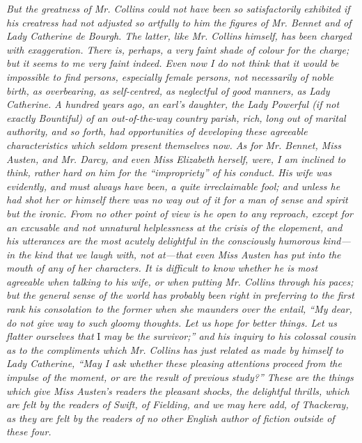 \documentclass[12pt]{book}
\begin{document}
\textit{But the greatness of Mr. Collins could not have been so satisfactorily exhibited if his creatress had not adjusted so artfully to him the figures of Mr. Bennet and of Lady Catherine de Bourgh. The latter, like Mr. Collins himself, has been charged with exaggeration. There is, perhaps, a very faint shade of colour for the charge; but it seems to me very faint indeed. Even now I do not think that it would be impossible to find persons, especially female persons, not necessarily of noble birth, as overbearing, as self-centred, as neglectful of good manners, as Lady Catherine. A hundred years ago, an earl's daughter, the Lady Powerful (if not exactly Bountiful) of an out-of-the-way country parish, rich, long out of marital authority, and so forth, had opportunities of developing these agreeable characteristics which seldom present themselves now. As for Mr. Bennet, Miss Austen, and Mr. Darcy, and even Miss Elizabeth herself, were, I am inclined to think, rather hard on him for the ``impropriety'' of his conduct. His wife was evidently, and must always have been, a quite irreclaimable fool; and unless he had shot her or himself there was no way out of it for a man of sense and spirit but the ironic. From no other point of view is he open to any reproach, except for an excusable and not unnatural helplessness at the crisis of the elopement, and his utterances are the most acutely delightful in the consciously humorous kind---in the kind that we laugh with, not at---that even Miss Austen has put into the mouth of any of her characters. It is difficult to know whether he is most agreeable when talking to his wife, or when putting Mr. Collins through his paces; but the general sense of the world has probably been right in preferring to the first rank his consolation to the former when she maunders over the entail, ``My dear, do not give way to such gloomy thoughts. Let us hope for better things. Let us flatter ourselves that} I \textit{may be the survivor;'' and his inquiry to his colossal cousin as to the compliments which Mr. Collins has just related as made by himself to Lady Catherine, ``May I ask whether these pleasing attentions proceed from the impulse of the moment, or are the result of previous study?'' These are the things which give Miss Austen's readers the pleasant shocks, the delightful thrills, which are felt by the readers of Swift, of Fielding, and we may here add, of Thackeray, as they are felt by the readers of no other English author of fiction outside of these four.}
\end{document}
